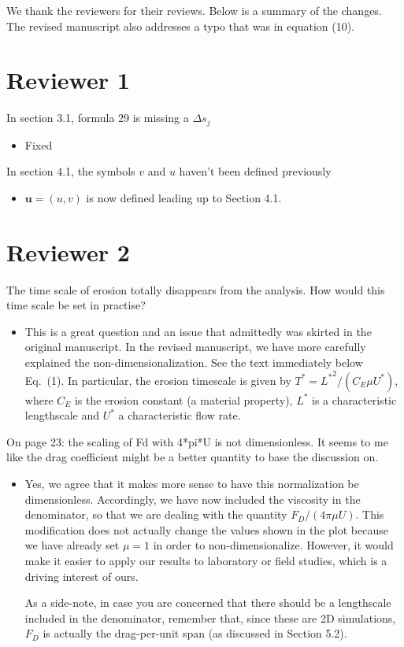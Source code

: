 \documentclass[11pt]{article}
\newcommand{\comment}[1]{{\color{blue} #1}}
\begin{document}
\noindent
We thank the reviewers for their reviews.  Below is a summary of the
changes.  The revised manuscript also addresses a typo that was in
equation (10).

\section*{Reviewer 1}

\noindent
\comment{In section 3.1, formula 29 is missing a $\Delta s_{j}$}
\begin{itemize}
  \item Fixed
\end{itemize}

\noindent
\comment{In section 4.1, the symbols $v$ and $u$ haven't been defined
previously}
\begin{itemize}
  \item $\mathbf{u} = (u,v)$ is now defined leading up to Section 4.1.
\end{itemize}



\section*{Reviewer 2}
\noindent
\comment{The time scale of erosion totally disappears from the analysis.
How would this time scale be set in practise?}
\begin{itemize}
\item This is a great question and an issue that admittedly was skirted in the original manuscript. In the revised manuscript, we have more carefully explained the non-dimensionalization. See the text immediately below Eq.~(1). In particular, the erosion timescale is given by $T^* = {L^*}^2/(C_E \mu U^*)$, where $C_E$ is the erosion constant (a material property), $L^*$ is a characteristic lengthscale and $U^*$ a characteristic flow rate.
\end{itemize}

\noindent
\comment{On page 23: the scaling of Fd with 4*pi*U is not dimensionless.
It seems to me like the drag coefficient might be a better quantity to
base the discussion on.}
\begin{itemize}
\item Yes, we agree that it makes more sense to have this normalization be dimensionless.  Accordingly, we have now included the viscosity in the denominator, so that we are dealing with the quantity $F_D /(4 \pi \mu U)$. This modification does not actually change the values shown in the plot because we have already set $\mu =1$ in order to non-dimensionalize. However, it would make it easier to apply our results to laboratory or field studies, which is a driving interest of ours.

As a side-note, in case you are concerned that there should be a lengthscale included in the denominator, remember that, since these are 2D simulations, $F_D$ is actually the drag-per-unit span (as discussed in Section 5.2).
\end{itemize}
\end{document}
